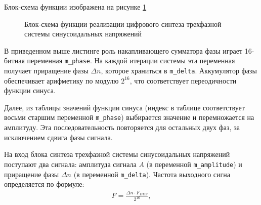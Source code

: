         Блок-схема функции изображена на рисунке \ref{fig:bs-dds}

        \begin{figure}[h!]
            \caption{Блок-схема функции реализации цифрового синтеза трехфазной
                системы синусоидальных напряжений}
            \label{fig:bs-dds}
        \end{figure}

        В приведенном выше листинге роль накапливающего сумматора фазы играет
        16-битная переменная \verb"m_phase". На каждой итерации системы эта
        переменная получает приращение фазы $\Delta n$, которое храниться в
        \verb"m_delta". Аккумулятор фазы обеспечивает арифметику по модулю
        $2^{16}$, что соответствует переодичности функции синуса. 

        Далее, из таблицы значений функции синуса (индекс в таблице
        соответствует восьми старшим переменной \verb"m_phase") выбирается
        значение и перемножается на амплитуду. Эта последовательность
        повторяется для остальных двух фаз, за исключением сдвига фазы сигнала.

        На вход блока синтеза трехфазной системы синусоидальных напряжений
        поступают два сигнала: амплитуда сигнала $A$ (в переменной
        \verb"m_amplitude") и приращение фазы $\Delta n$ (в переменной
        \verb"m_delta"). Частота выходного сигна определяется по формуле:
        \begin{gather*}
            F = \frac{\Delta n \cdot F_{DDS}}{2^{16}},
        \end{gather*}

